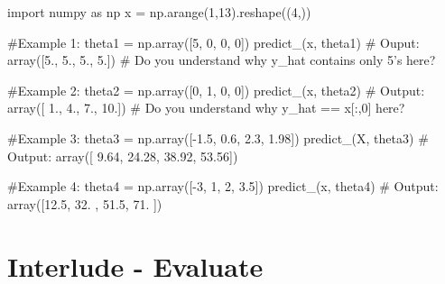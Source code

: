 \documentclass[]{article}
\newenvironment{Shaded}{\begin{snugshade}}{\end{snugshade}}
\newcommand{\CommentTok}[1]{\textcolor[rgb]{0.48,0.49,0.49}{#1}}
\newcommand{\DecValTok}[1]{\textcolor[rgb]{0.96,0.45,0.00}{#1}}
\newcommand{\FloatTok}[1]{\textcolor[rgb]{0.96,0.45,0.00}{#1}}
\newcommand{\ImportTok}[1]{\textcolor[rgb]{0.15,0.68,0.38}{#1}}
\newcommand{\NormalTok}[1]{\textcolor[rgb]{0.81,0.81,0.76}{#1}}
\newcommand{\OperatorTok}[1]{\textcolor[rgb]{0.81,0.81,0.76}{#1}}
\begin{document}
\begin{Shaded}
\begin{Highlighting}[]
\ImportTok{import}\NormalTok{ numpy }\ImportTok{as}\NormalTok{ np}
\NormalTok{x }\OperatorTok{=}\NormalTok{ np.arange(}\DecValTok{1}\NormalTok{,}\DecValTok{13}\NormalTok{).reshape((}\DecValTok{4}\NormalTok{,))}

\CommentTok{#Example 1:}
\NormalTok{theta1 }\OperatorTok{=}\NormalTok{ np.array([}\DecValTok{5}\NormalTok{, }\DecValTok{0}\NormalTok{, }\DecValTok{0}\NormalTok{, }\DecValTok{0}\NormalTok{])}
\NormalTok{predict_(x, theta1)}
\CommentTok{# Ouput:}
\NormalTok{array([}\FloatTok{5.}\NormalTok{, }\FloatTok{5.}\NormalTok{, }\FloatTok{5.}\NormalTok{, }\FloatTok{5.}\NormalTok{])}
\CommentTok{# Do you understand why y_hat contains only 5's here?  }

\CommentTok{#Example 2:}
\NormalTok{theta2 }\OperatorTok{=}\NormalTok{ np.array([}\DecValTok{0}\NormalTok{, }\DecValTok{1}\NormalTok{, }\DecValTok{0}\NormalTok{, }\DecValTok{0}\NormalTok{])}
\NormalTok{predict_(x, theta2)}
\CommentTok{# Output:}
\NormalTok{array([ }\FloatTok{1.}\NormalTok{,  }\FloatTok{4.}\NormalTok{,  }\FloatTok{7.}\NormalTok{, }\FloatTok{10.}\NormalTok{])}
\CommentTok{# Do you understand why y_hat == x[:,0] here?  }


\CommentTok{#Example 3:}
\NormalTok{theta3 }\OperatorTok{=}\NormalTok{ np.array([}\OperatorTok{-}\FloatTok{1.5}\NormalTok{, }\FloatTok{0.6}\NormalTok{, }\FloatTok{2.3}\NormalTok{, }\FloatTok{1.98}\NormalTok{])}
\NormalTok{predict_(X, theta3)}
\CommentTok{# Output:}
\NormalTok{array([ }\FloatTok{9.64}\NormalTok{, }\FloatTok{24.28}\NormalTok{, }\FloatTok{38.92}\NormalTok{, }\FloatTok{53.56}\NormalTok{])}


\CommentTok{#Example 4:}
\NormalTok{theta4 }\OperatorTok{=}\NormalTok{ np.array([}\OperatorTok{-}\DecValTok{3}\NormalTok{, }\DecValTok{1}\NormalTok{, }\DecValTok{2}\NormalTok{, }\FloatTok{3.5}\NormalTok{])}
\NormalTok{predict_(x, theta4)}
\CommentTok{# Output:}
\NormalTok{array([}\FloatTok{12.5}\NormalTok{, }\FloatTok{32.}\NormalTok{ , }\FloatTok{51.5}\NormalTok{, }\FloatTok{71.}\NormalTok{ ])}
\end{Highlighting}
\end{Shaded}

\clearpage

\hypertarget{interlude---evaluate-1}{%
\section{Interlude - Evaluate}\label{interlude---evaluate-1}}
\end{document}

